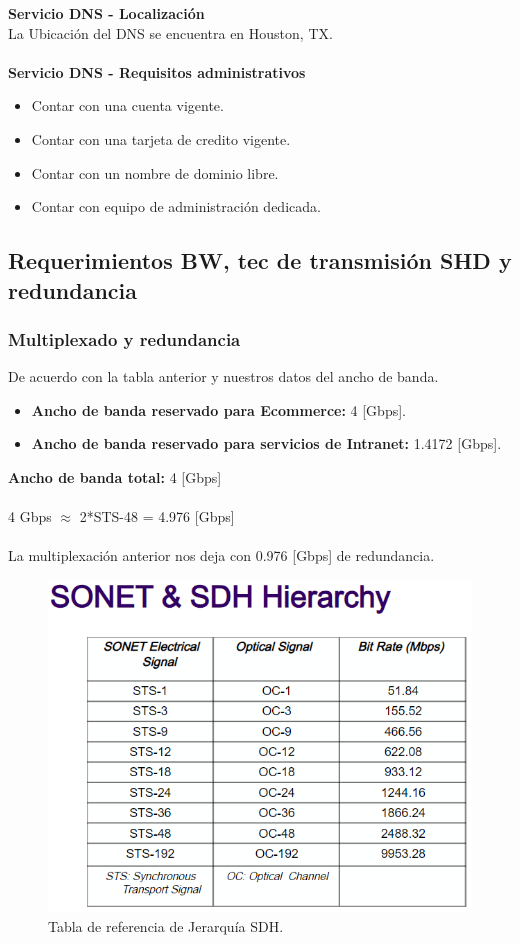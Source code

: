 \documentclass[12pt,letterpaper]{article}
\begin{document}
\textbf{Servicio DNS - Localización}\\
La Ubicación del DNS se encuentra en Houston, TX. 
\\ \\
\textbf{Servicio DNS - Requisitos administrativos}
\begin{itemize}
    \item Contar con una cuenta vigente.
    \item Contar con una tarjeta de credito vigente.
    \item Contar con un nombre de dominio libre.
    \item Contar con equipo de administración dedicada.
\end{itemize}

\subsection{Requerimientos BW, tec de transmisión SHD y redundancia}
\subsubsection{Multiplexado y redundancia}
De acuerdo con la tabla anterior y nuestros datos del ancho de banda.
\begin{itemize}
    \item \textbf{Ancho de banda reservado para Ecommerce: } 4 [Gbps].
    \item \textbf{Ancho de banda reservado para servicios de Intranet: } 1.4172 [Gbps].
\end{itemize}

\textbf{Ancho de banda total: } 4 [Gbps]
\\ \\
4 Gbps $\approx$ 2*STS-48 = 4.976 [Gbps]
\\ \\
La multiplexación anterior nos deja con 0.976 [Gbps] de redundancia.

\newpage
\begin{figure}[ht]
    \centering
    \includegraphics[width=.8\textwidth]{imagenes/sdhj1.png}
    \caption{Tabla de referencia de Jerarquía SDH.}
\end{figure}
\end{document}
